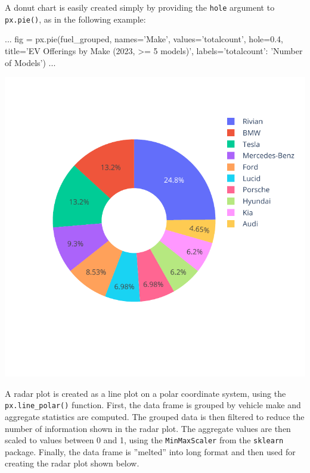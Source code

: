 A donut chart is easily created simply by providing the \texttt{hole} argument to \texttt{px.pie()}, as in the following example:

\begin{samepage}
\begin{pythoncode}
...
fig = px.pie(fuel_grouped, 
    names='Make', values='totalcount', hole=0.4,
    title='EV Offerings by Make (2023, >= 5 models)',
    labels={'totalcount': 'Number of Models'})
...
\end{pythoncode}
\end{samepage}

\begin{center}
  \includegraphics[width=.6\textwidth]{px.fuel.donut.pdf}
\end{center}

A radar plot is created as a line plot on a polar coordinate system, using the \texttt{px.line\_polar()} function. First, the data frame is grouped by vehicle make and aggregate statistics are computed. The grouped data is then filtered to reduce the number of information shown in the radar plot. The aggregate values are then scaled to values between 0 and 1, using the \texttt{MinMaxScaler} from the \texttt{sklearn} package. Finally, the data frame is ''melted'' into long format and then used for creating the radar plot shown below. 

